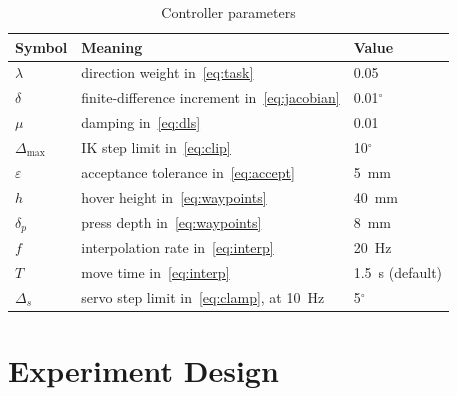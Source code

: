 \documentclass[conference]{IEEEtran}
\begin{document}
\begin{table}[t]
\centering
\caption{Controller parameters}
\label{tab:control}
\begin{tabular}{@{}lll@{}}
\toprule
Symbol & Meaning & Value \\
\midrule
$\lambda$ & direction weight in~\eqref{eq:task} & 0.05 \\
$\delta$ & finite-difference increment in~\eqref{eq:jacobian} & 0.01$^\circ$ \\
$\mu$ & damping in~\eqref{eq:dls} & 0.01 \\
$\Delta_{\max}$ & IK step limit in~\eqref{eq:clip} & 10$^\circ$ \\
$\varepsilon$ & acceptance tolerance in~\eqref{eq:accept} & 5~mm \\
$h$ & hover height in~\eqref{eq:waypoints} & 40~mm \\
$\delta_p$ & press depth in~\eqref{eq:waypoints} & 8~mm \\
$f$ & interpolation rate in~\eqref{eq:interp} & 20~Hz \\
$T$ & move time in~\eqref{eq:interp} & 1.5~s (default) \\
$\Delta_s$ & servo step limit in~\eqref{eq:clamp}, at 10~Hz & 5$^\circ$ \\
\bottomrule
\end{tabular}
\end{table}

\section{Experiment Design}
\label{sec:experiment}
\end{document}
